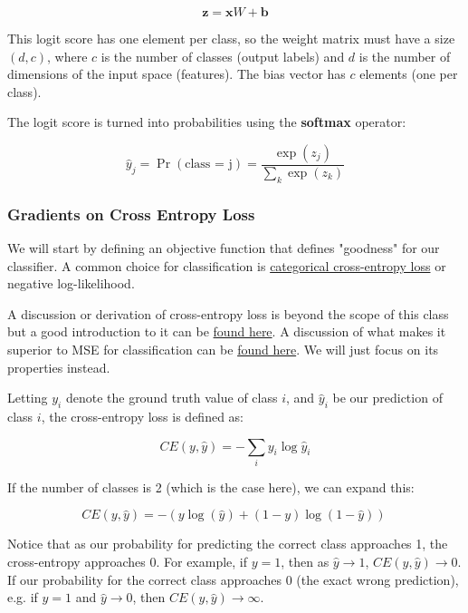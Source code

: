 $$
    \mathbf{z} = \mathbf{x} W + \mathbf{b}
$$

This logit score has one element per class, so the weight matrix must have a size $(d, c)$, where $c$ is the number of classes (output labels) and $d$ is the number of dimensions of the input space (features). The bias vector has $c$ elements (one per class).

The logit score is turned into probabilities using the \textbf{softmax}  operator:

$$
    \hat{y}_j = \Pr(\text{class = j}) = \frac{\exp(z_j)}{\sum_k \exp(z_k)}
$$


\subsubsection{Gradients on Cross Entropy Loss}
We will start by defining an objective function that defines "goodness" for our classifier.
A common choice for classification is \href{https://en.wikipedia.org/wiki/Cross_entropy}{categorical cross-entropy loss} or negative log-likelihood.

A discussion or derivation of cross-entropy loss is beyond the scope of this class but a good introduction to it can be \href{https://rdipietro.github.io/friendly-intro-to-cross-entropy-loss/}{found here}. A discussion of what makes it superior to MSE for classification can be \href{https://jamesmccaffrey.wordpress.com/2013/11/05/why-you-should-use-cross-entropy-error-instead-of-classification-error-or-mean-squared-error-for-neural-network-classifier-training/}{found here}. We will just focus on its properties instead.

Letting $y_i$ denote the ground truth value of class $i$, and $\hat{y}_i$ be our prediction of class $i$, the cross-entropy loss is defined as:

$$ CE(y, \hat{y}) = -\sum_{i} y_i \log \hat{y}_i $$

If the number of classes is 2 (which is the case here), we can expand this:

$$ CE(y, \hat{y}) = -{(y\log(\hat{y}) + (1 - y)\log(1 - \hat{y}))}\ $$

Notice that as our probability for predicting the correct class approaches 1, the cross-entropy approaches 0. For example, if $y=1$, then as $\hat{y}\rightarrow 1$, $CE(y, \hat{y}) \rightarrow 0$. If our probability for the correct class approaches 0 (the exact wrong prediction), e.g. if $y=1$ and $\hat{y} \rightarrow 0$, then $CE(y, \hat{y}) \rightarrow \infty$.

